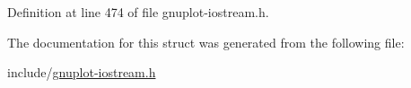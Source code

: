 Definition at line 474 of file gnuplot-\/iostream.\+h.



The documentation for this struct was generated from the following file\+:\begin{DoxyCompactItemize}
\item 
include/\hyperlink{gnuplot-iostream_8h}{gnuplot-\/iostream.\+h}\end{DoxyCompactItemize}
